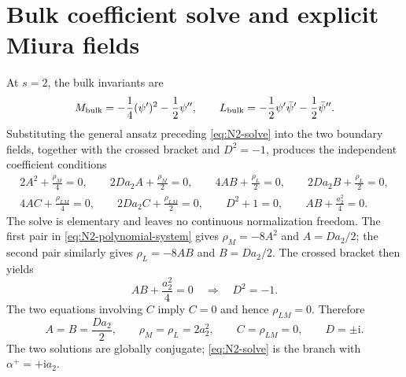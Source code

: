 \documentclass[11pt,a4paper]{article}
\numberwithin{equation}{section}
\theoremstyle{remark}
\newcommand{\ii}{\mathrm{i}}
\begin{document}
\section{Bulk coefficient solve and explicit Miura fields}
\label{app:bulk-details}

At $s=2$, the bulk invariants are
\begin{equation}
 M_{\rm bulk}=-\frac14(\psi')^2-\frac12\psi'',
 \qquad
 L_{\rm bulk}=-\frac12\psi'\bar\psi'-\frac12\bar\psi''.
 \label{eq:N2-bulk-fields}
\end{equation}
Substituting the general ansatz preceding \cref{eq:N2-solve} into the two boundary fields,
together with the crossed bracket and $D^2=-1$, produces the independent coefficient
conditions
\begin{gather}
 2A^2+\frac{\rho_M}{4}=0,\qquad
 2Da_2A+\frac{\rho_M}{2}=0,\qquad
 4AB+\frac{\rho_L}{2}=0,\qquad
 2Da_2B+\frac{\rho_L}{2}=0,
 \nonumber\\
 4AC+\frac{\rho_{LM}}4=0,\qquad
 2Da_2C+\frac{\rho_{LM}}2=0,\qquad
 D^2+1=0,\qquad
 AB+\frac{a_2^2}{4}=0.
 \label{eq:N2-polynomial-system}
\end{gather}
The solve is elementary and leaves no continuous normalization freedom.  The first pair in
\cref{eq:N2-polynomial-system} gives
$\rho_M=-8A^2$ and $A=Da_2/2$; the second pair similarly gives
$\rho_L=-8AB$ and $B=Da_2/2$.  The crossed bracket then yields
\begin{equation}
 AB+\frac{a_2^2}{4}=0
 \quad\Longrightarrow\quad D^2=-1.
 \label{eq:N2-branch-equation}
\end{equation}
The two equations involving $C$ imply $C=0$ and hence $\rho_{LM}=0$.  Therefore
\begin{equation}
 A=B=\frac{Da_2}{2},\qquad
 \rho_M=\rho_L=2a_2^2,\qquad
 C=\rho_{LM}=0,\qquad D=\pm\ii.
 \label{eq:N2-complete-solution}
\end{equation}
The two solutions are globally conjugate; \cref{eq:N2-solve} is the branch with
$\alpha^+=+\ii a_2$.
\end{document}

